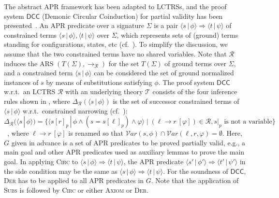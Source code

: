 \documentclass[10pt,a4paper]{article}
\def\cR{\mathcal{R}}
\def\cT{\mathcal{T}}
\newcommand{\Var}{\mathcal{V}ar}
\newcommand{\Constraint}[1]{[ #1 ]}
\newcommand{\CTerm}[2]{\langle #1 \,|\, #2 \rangle}
\newcommand{\ReachPred}[2]{#1 \Rightarrow #2}
\newcommand{\RuleName}[1]{{\rm \textsc{#1}}}
\newcommand{\DCC}[1][]{\mathsf{DCC}}
\newcommand{\cTheory}{\cT}
\begin{document}
The abstract APR framework has been adapted to LCTRSs, and the proof system $\DCC$ (Demonic Circular Coinduction) for partial validity has been presented~\cite{CL18}.
An APR predicate over a signature $\Sigma$ is a pair $\ReachPred{\CTerm{s}{\phi}}{\CTerm{t}{\psi}}$ of constrained terms $\CTerm{s}{\phi},\CTerm{t}{\psi}$ over $\Sigma$, which represents sets of (ground) terms standing for configurations, states, etc (cf.~\cite{FKN17tocl,KN18eptcs,KN23padl}).
To simplify the discussion, we assume that the two constrained terms have no shared variables.
Note that $\cR$ induces the ARS $(T(\Sigma),\to_\cR)$ for the set $T(\Sigma)$ of ground terms over $\Sigma$, and a constrained term $\CTerm{s}{\phi}$ can be considered the set of ground normalized instances of $s$ by means of substitutions satisfying $\phi$.
The proof system $\DCC$ w.r.t.\ an LCTRS $\cR$ with an underlying theory $\cTheory$ consists of the four inference rules shown in , where $\Delta_\cR(\CTerm{s}{\phi})$ is the set of successor constrained terms of $\CTerm{s}{\phi}$ w.r.t.\ constrained narrowing (cf.~\cite[Lemma~3.5]{KN24jip}):
$\Delta_\cR(\CTerm{s}{\phi}) = \{ \CTerm{s[r]_p}{\phi \land (s = s[\ell]_p) \land \varphi} \mid (\ell \to r ~\Constraint{\varphi}) \in \cR, \mbox{$s|_p$ is not a variable} \}$~\cite[Definition~11]{CL18},
where $\ell \to r ~\Constraint{\varphi}$ is renamed so that $\Var(s,\phi) \cap \Var(\ell,r,\varphi) = \emptyset$.
Here, $G$ given in advance is a set of APR predicates to be proved partially valid, e.g., a main goal and other APR predicates used as auxiliary lemmas to prove the main goal.
In applying \RuleName{Circ} to $\ReachPred{\CTerm{s}{\phi}}{\CTerm{t}{\psi}}$,
the APR predicate $\ReachPred{\CTerm{s'}{\phi'}}{\CTerm{t'}{\psi'}}$ in the side condition may be the same as $\ReachPred{\CTerm{s}{\phi}}{\CTerm{t}{\psi}}$.
For the soundness of $\DCC$, \RuleName{Der} has to be applied to all APR predicates in $G$. Note that the application of \RuleName{Subs} is followed by \RuleName{Circ} or either \RuleName{Axiom} or \RuleName{Der}.
\end{document}
